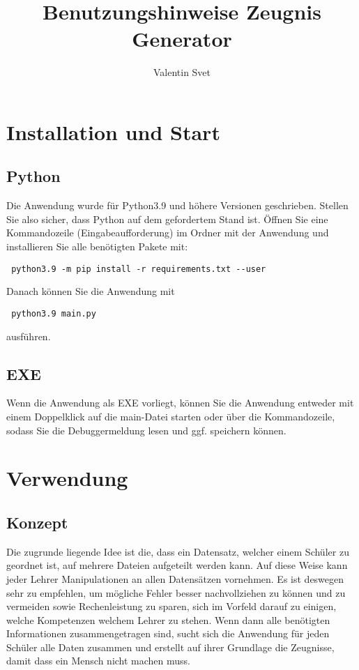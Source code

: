 \documentclass[a4paper,10pt]{scrartcl}
\title{Benutzungshinweise Zeugnis Generator}
\author{Valentin Svet}
\begin{document}
\maketitle

\newpage

\tableofcontents

\newpage

\section{Installation und Start}
   \subsection{Python}
      Die Anwendung wurde für Python3.9 und höhere Versionen geschrieben. Stellen Sie also sicher, dass Python auf dem gefordertem Stand ist.
      Öffnen Sie eine Kommandozeile (Eingabeaufforderung) im Ordner mit der Anwendung und installieren Sie alle benötigten Pakete mit:
      \begin{verbatim} python3.9 -m pip install -r requirements.txt --user \end{verbatim}
      Danach können Sie die Anwendung mit 
      \begin{verbatim} python3.9 main.py  \end{verbatim}
      ausführen. 

   \subsection{EXE}
      Wenn die Anwendung als EXE vorliegt, können Sie die Anwendung entweder mit einem Doppelklick auf die main-Datei starten oder über die Kommandozeile, sodass Sie die Debuggermeldung lesen und ggf. speichern können.

\section{Verwendung}
   \subsection{Konzept}
     Die zugrunde liegende Idee ist die, dass ein Datensatz, welcher einem Schüler zu geordnet ist, auf mehrere Dateien aufgeteilt werden kann. Auf diese Weise kann jeder Lehrer Manipulationen an allen Datensätzen vornehmen. Es ist deswegen sehr zu empfehlen, um mögliche Fehler besser nachvollziehen zu können und zu vermeiden sowie Rechenleistung zu sparen, sich im Vorfeld darauf zu einigen, welche Kompetenzen welchem Lehrer zu stehen. \newline
     Wenn dann alle benötigten Informationen zusammengetragen sind, sucht sich die Anwendung für jeden Schüler alle Daten zusammen und erstellt auf ihrer Grundlage die Zeugnisse, damit dass ein Mensch nicht machen muss.
\end{document}
